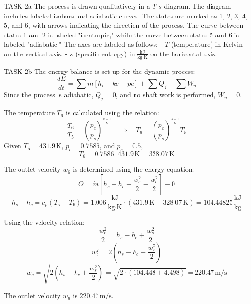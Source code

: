 TASK 2a  
The process is drawn qualitatively in a \( T \)-\( s \) diagram. The diagram includes labeled isobars and adiabatic curves. The states are marked as 1, 2, 3, 4, 5, and 6, with arrows indicating the direction of the process. The curve between states 1 and 2 is labeled "isentropic," while the curve between states 5 and 6 is labeled "adiabatic." The axes are labeled as follows:  
- \( T \) (temperature) in Kelvin on the vertical axis.  
- \( s \) (specific entropy) in \( \frac{\text{kJ}}{\text{kg·K}} \) on the horizontal axis.  

TASK 2b  
The energy balance is set up for the dynamic process:  
\[
\frac{dE}{dt} = \sum \dot{m} \left[ h_i + ke + pe \right] + \sum Q_j - \sum W_n
\]  
Since the process is adiabatic, \( Q_j = 0 \), and no shaft work is performed, \( W_n = 0 \).  

The temperature \( T_6 \) is calculated using the relation:  
\[
\frac{T_6}{T_5} = \left( \frac{p_c}{p_s} \right)^{\frac{\kappa - 1}{\kappa}} \quad \Rightarrow \quad T_6 = \left( \frac{p_c}{p_s} \right)^{\frac{\kappa - 1}{\kappa}} T_5
\]  
Given \( T_5 = 431.9 \, \text{K} \), \( p_c = 0.7586 \), and \( p_s = 0.5 \),  
\[
T_6 = 0.7586 \cdot 431.9 \, \text{K} = 328.07 \, \text{K}
\]  

The outlet velocity \( w_6 \) is determined using the energy equation:  
\[
O = \dot{m} \left[ h_s - h_c + \frac{w_s^2}{2} - \frac{w_c^2}{2} \right] - 0
\]  
\[
h_s - h_c = c_p \left( T_5 - T_6 \right) = 1.006 \, \frac{\text{kJ}}{\text{kg·K}} \cdot (431.9 \, \text{K} - 328.07 \, \text{K}) = 104.44825 \, \frac{\text{kJ}}{\text{kg}}
\]  

Using the velocity relation:  
\[
\frac{w_c^2}{2} = h_s - h_c + \frac{w_s^2}{2}
\]  
\[
w_c^2 = 2 \left( h_s - h_c + \frac{w_s^2}{2} \right)
\]  
\[
w_c = \sqrt{2 \left( h_s - h_c + \frac{w_s^2}{2} \right)} = \sqrt{2 \cdot (104.448 + 4.498)} = 220.47 \, \text{m/s}
\]  

The outlet velocity \( w_6 \) is \( 220.47 \, \text{m/s} \).